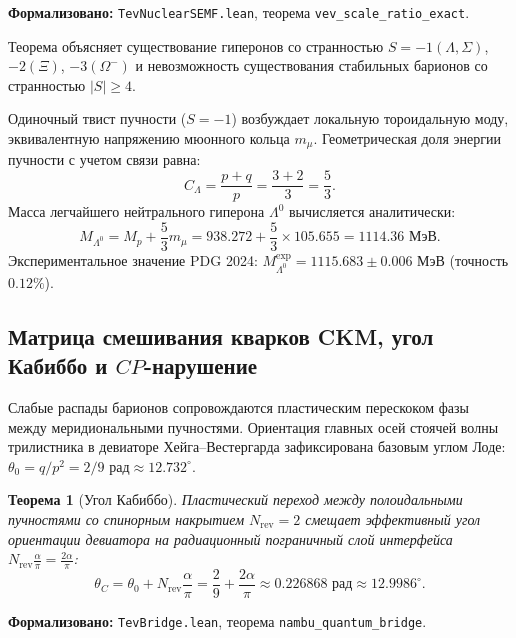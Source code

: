 \documentclass[11pt,a4paper]{article}
\newtheorem{theorem}{Теорема}
\theoremstyle{definition}
\theoremstyle{remark}
\begin{document}
\noindent\small\textbf{Формализовано:} \texttt{TevNuclearSEMF.lean}, теорема \texttt{vev_scale_ratio_exact}.

Теорема объясняет существование гиперонов со странностью $S = -1 (\Lambda, \Sigma)$, $-2 (\Xi)$, $-3 (\Omega^-)$ и невозможность существования стабильных барионов со странностью $|S| \ge 4$.
	
Одиночный твист пучности ($S = -1$) возбуждает локальную тороидальную моду, эквивалентную напряжению мюонного кольца $m_\mu$. Геометрическая доля энергии пучности с учетом связи равна:
\begin{equation}
	C_\Lambda = \frac{p + q}{p} = \frac{3 + 2}{3} = \frac{5}{3}.
	\label{eq:lambda_hyperon_coeff}
\end{equation}
Масса легчайшего нейтрального гиперона $\Lambda^0$ вычисляется аналитически:
\begin{equation}
M_{\Lambda^0} = M_p + \frac{5}{3} m_\mu = 938.272 + \frac{5}{3} \times 105.655 = 1114.36\text{ МэВ}.
\label{eq:lambda_hyperon_mass_exact}
\end{equation}
Экспериментальное значение PDG 2024: $M_{\Lambda^0}^{\mathrm{exp}} = 1115.683 \pm 0.006\text{ МэВ}$ (точность $0.12\%$).
	
\subsection{Матрица смешивания кварков CKM, угол Кабиббо и $CP$-нарушение}
	
Слабые распады барионов сопровождаются пластическим перескоком фазы между меридиональными пучностями. Ориентация главных осей стоячей волны трилистника в девиаторе Хейга--Вестергарда зафиксирована базовым углом Лоде: $\theta_0 = q / p^2 = 2/9\text{ рад} \approx 12.732^\circ$.
	
\begin{theorem}[Угол Кабиббо]
\label{thm:cabibbo_angle_exact}
Пластический переход между полоидальными пучностями со спинорным накрытием $N_{\mathrm{rev}} = 2$ смещает эффективный угол ориентации девиатора на радиационный пограничный слой интерфейса $N_{\mathrm{rev}}\frac{\alpha}{\pi} = \frac{2\alpha}{\pi}$:
\begin{equation}
	\theta_C = \theta_0 + N_{\mathrm{rev}}\frac{\alpha}{\pi} = \frac{2}{9} + \frac{2\alpha}{\pi} \approx 0.226868\text{ рад} \approx 12.9986^\circ.
	\label{eq:cabibbo_angle_exact}
\end{equation}
\end{theorem}

\noindent\small\textbf{Формализовано:} \texttt{TevBridge.lean}, теорема \texttt{nambu_quantum_bridge}.
	
\end{document}
